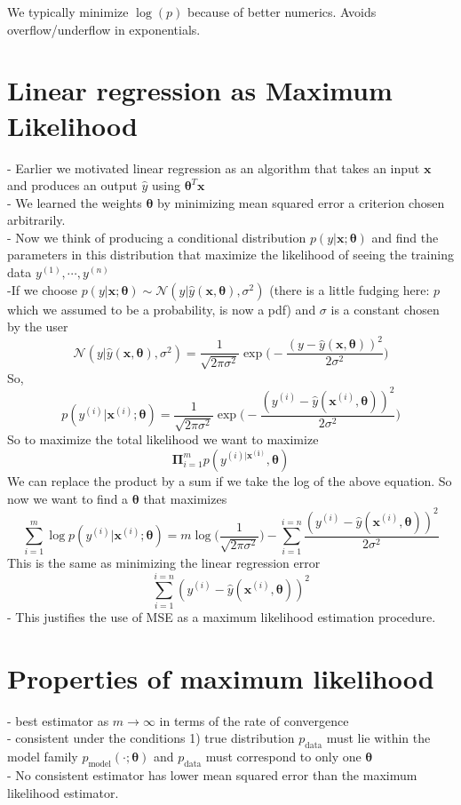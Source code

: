 \documentclass{article}
\newcommand{\beq}{\begin{equation}}
\newcommand{\eeq}{\end{equation}}
\begin{document}
We typically minimize $\log{(p)}$ because of better numerics. Avoids overflow/underflow in exponentials.

\section{Linear regression as Maximum Likelihood}
- Earlier we motivated linear regression as an algorithm that takes an input $\pmb{x}$ and produces an output $\hat{y}$ using ${\pmb{\theta}}^T\pmb{x}$\\
- We learned the weights $\pmb{\theta}$ by minimizing mean squared error a criterion chosen arbitrarily.\\
- Now we think of producing a conditional distribution $p(y|\pmb{x};\pmb{\theta})$ and find the parameters in this distribution that maximize the likelihood of seeing the training data $y^{(1)},\cdots,y^{(n)}$\\
-If we choose $p(y|\pmb{x};\pmb{\theta}) \sim \mathcal{N}(y|\hat{y}(\pmb{x},\pmb{\theta}),\sigma^2)$ (there is a little fudging here: $p$ which we assumed to be a probability, is now a pdf) and $\sigma$ is a constant chosen by the user\\
\beq
\mathcal{N}(y|\hat{y}(\pmb{x},\pmb{\theta}),\sigma^2) = \frac{1}{\sqrt{2\pi\sigma^2}}\exp\Big(-\frac{(y-\hat{y}(\pmb{x},\pmb{\theta}))^2}{2\sigma^2}\Big) 
\eeq
So,
\beq
p(y^{(i)}|\pmb{x}^{(i)};\pmb{\theta}) = \frac{1}{\sqrt{2\pi\sigma^2}}\exp\Big(-\frac{(y^{(i)}-\hat{y}(\pmb{x}^{(i)},\pmb{\theta}))^2}{2\sigma^2}\Big) 
\eeq
So to maximize the total likelihood we want to maximize
\beq
\pmb{\Pi}_{i=1}^{m}p(y^{(i)|\pmb{x^{(i)}}},\pmb{\theta})
\eeq
We can replace the product by a sum if we take the log of the above equation. So now we want to find a $\pmb{\theta}$ that maximizes
\beq
\sum_{i=1}^{m}\log{}p(y^{(i)}|\pmb{x}^{(i)};\pmb{\theta}) = m\log\Big(\frac{1}{\sqrt{2\pi\sigma^2}}\Big) - \sum_{i=1}^{i=n}\frac{(y^{(i)}-\hat{y}(\pmb{x}^{(i)},\pmb{\theta}))^2}{2\sigma^2}
\eeq
This is the same as minimizing the linear regression error
\beq
\sum_{i=1}^{i=n}(y^{(i)}-\hat{y}(\pmb{x}^{(i)},\pmb{\theta}))^2
\eeq
- This justifies the use of MSE as a maximum likelihood estimation procedure.
\section{Properties of maximum likelihood}
- best estimator as $m\rightarrow\infty$ in terms of the rate of convergence\\
- consistent under the conditions 1) true distribution $p_{\text{data}}$ must lie within the model family $p_{\text{model}}(\cdot;\pmb{\theta})$ and $p_{\text{data}}$ must correspond to only one $\pmb{\theta}$\\
- No consistent estimator has lower mean squared error than the maximum likelihood estimator.
\end{document}
